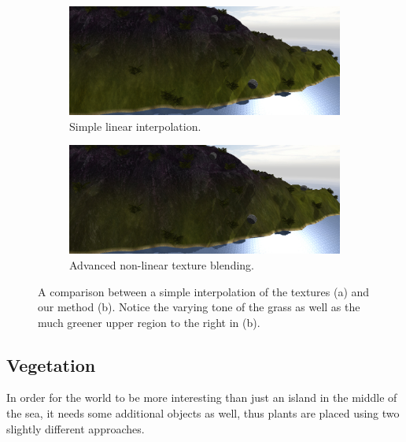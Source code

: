 \begin{figure}[H]
\begin{subfigure}{0.78\textwidth}
  \centering
  \includegraphics[width=0.9\linewidth]{images/textureBlendingComparison2_simple.jpg}
  \caption{Simple linear interpolation.}
\end{subfigure}

\begin{subfigure}{0.78\textwidth}
  \centering
  \includegraphics[width=0.9\linewidth]{images/textureBlendingComparison2_advanced.jpg}
  \caption{Advanced non-linear texture blending.}
\end{subfigure}
\caption{A comparison between a simple interpolation of the textures (a) and our method (b). Notice the varying tone of the grass as well as the much greener upper region to the right in (b).}
\label{fig:textureComparison2}
\end{figure}

\newpage
\subsection{Vegetation}
In order for the world to be more interesting than just an island in the middle of the sea, it needs some additional objects as well, thus plants are placed using two slightly different approaches.

